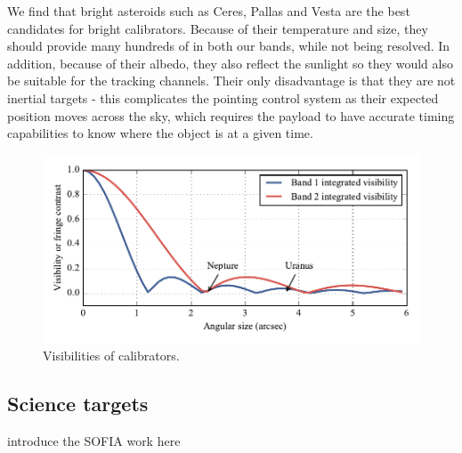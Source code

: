 We find that bright asteroids such as Ceres, Pallas and Vesta are the best candidates for bright calibrators. Because of their temperature and size, they should provide many hundreds of \si{\jansky} in both our bands, while not being resolved. In addition, because of their albedo, they also reflect the sunlight so they would also be suitable for the tracking channels. Their only disadvantage is that they are not inertial targets - this complicates the pointing control system as their expected position moves across the sky, which requires the payload to have accurate timing capabilities to know where the object is at a given time.

\begin{figure}[!h]
	\centering
	\includegraphics[width=\textwidth]{Figures/Visibilities.pdf}
	\caption[Visibilities of calibrators]{Visibilities of calibrators.}
	\label{fig:Visibilities}
    \end{figure}


\subsection{Science targets}
introduce the SOFIA work here

